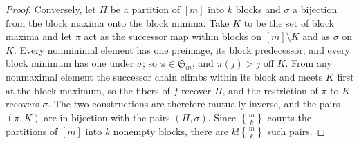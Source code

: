 \documentclass[10pt]{article} %
\theoremstyle{definition}
\newcommand{\Stirling}[2]{\genfrac{\{}{\}}{0pt}{}{#1}{#2}}
\begin{document}
\begin{proof}
Conversely, let \(\Pi\) be a partition of \([m]\) into \(k\) blocks and
\(\sigma\) a bijection from the block maxima onto the block minima.  Take
\(K\) to be the set of block maxima and let \(\pi\) act as the successor
map within blocks on \([m]\setminus K\) and as \(\sigma\) on \(K\).  Every
nonminimal element has one preimage, its block predecessor, and
every block minimum has one under \(\sigma\); so
\(\pi\in\mathfrak S_m\), and \(\pi(j)>j\) off \(K\).  From any nonmaximal
element the successor chain climbs within its block and meets \(K\) first
at the block maximum, so the fibers of \(f\) recover \(\Pi\), and the
restriction of \(\pi\) to \(K\) recovers \(\sigma\).  The two constructions
are therefore mutually inverse, and the pairs \((\pi,K)\) are in bijection
with the pairs \((\Pi,\sigma)\).  Since \(\Stirling{m}{k}\) counts the
partitions of \([m]\) into \(k\) nonempty blocks, there are
\(k!\Stirling{m}{k}\) such pairs.
\end{proof}
\end{document}
